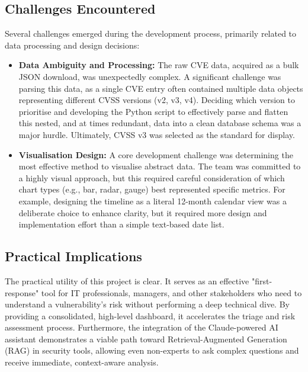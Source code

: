\documentclass[12pt,a4paper]{article}
\begin{document}
    \subsection{Challenges Encountered}
    Several challenges emerged during the development process, primarily related to data processing and design decisions:
    \begin{itemize}
        \item \textbf{Data Ambiguity and Processing:} The raw CVE data, acquired as a bulk JSON download, was unexpectedly complex. A significant challenge was parsing this data, as a single CVE entry often contained multiple data objects representing different CVSS versions (v2, v3, v4). Deciding which version to prioritise and developing the Python script to effectively parse and flatten this nested, and at times redundant, data into a clean database schema was a major hurdle. Ultimately, CVSS v3 was selected as the standard for display.
        \item \textbf{Visualisation Design:} A core development challenge was determining the most effective method to visualise abstract data. The team was committed to a highly visual approach, but this required careful consideration of which chart types (e.g., bar, radar, gauge) best represented specific metrics. For example, designing the timeline as a literal 12-month calendar view was a deliberate choice to enhance clarity, but it required more design and implementation effort than a simple text-based date list.
    \end{itemize}
    \subsection{Practical Implications}
    The practical utility of this project is clear. It serves as an effective "first-response" tool for IT professionals, managers, and other stakeholders who need to understand a vulnerability's risk without performing a deep technical dive. By providing a consolidated, high-level dashboard, it accelerates the triage and risk assessment process. Furthermore, the integration of the Claude-powered AI assistant demonstrates a viable path toward Retrieval-Augmented Generation (RAG) in security tools, allowing even non-experts to ask complex questions and receive immediate, context-aware analysis.
    \clearpage
\end{document}
